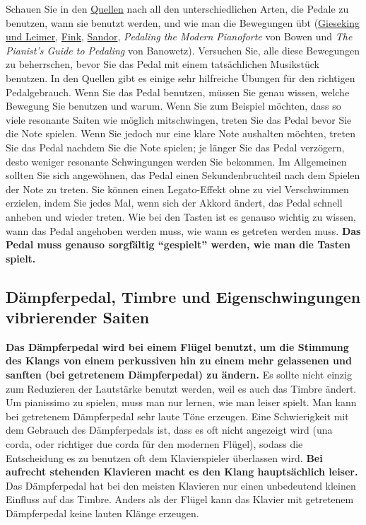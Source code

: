 Schauen Sie in den \hyperref[reference]{Quellen} nach all den unterschiedlichen Arten, die Pedale zu benutzen, wann sie benutzt werden, und wie man die Bewegungen übt (\hyperref[Gieseking]{Gieseking und Leimer}, \hyperref[Fink]{Fink}, \hyperref[Sandor]{Sandor}, \textit{Pedaling the Modern Pianoforte} von Bowen und \textit{The Pianist's Guide to Pedaling} von Banowetz).
Versuchen Sie, alle diese Bewegungen zu beherrschen, bevor Sie das Pedal mit einem tatsächlichen Musikstück benutzen.
In den Quellen gibt es einige sehr hilfreiche Übungen für den richtigen Pedalgebrauch.
Wenn Sie das Pedal benutzen, müssen Sie genau wissen, welche Bewegung Sie benutzen und warum.
Wenn Sie zum Beispiel möchten, dass so viele resonante Saiten wie möglich mitschwingen, treten Sie das Pedal bevor Sie die Note spielen.
Wenn Sie jedoch nur eine klare Note aushalten möchten, treten Sie das Pedal nachdem Sie die Note spielen; je länger Sie das Pedal verzögern, desto weniger resonante Schwingungen werden Sie bekommen.
Im Allgemeinen sollten Sie sich angewöhnen, das Pedal einen Sekundenbruchteil nach dem Spielen der Note zu treten.
Sie können einen Legato-Effekt ohne zu viel Verschwimmen erzielen, indem Sie jedes Mal, wenn sich der Akkord ändert, das Pedal schnell anheben und wieder treten.
Wie bei den Tasten ist es genauso wichtig zu wissen, wann das Pedal angehoben werden muss, wie wann es getreten werden muss.
\textbf{Das Pedal muss genauso sorgfältig \enquote{gespielt} werden, wie man die Tasten spielt.}


\subsection{Dämpferpedal, Timbre und Eigenschwingungen vibrierender Saiten}
\label{c1ii24}

\textbf{Das Dämpferpedal wird bei einem Flügel benutzt, um die Stimmung des Klangs von einem perkussiven hin zu einem mehr gelassenen und sanften (bei getretenem Dämpferpedal) zu ändern.}
Es sollte nicht einzig zum Reduzieren der Lautstärke benutzt werden, weil es auch das Timbre ändert.
Um pianissimo zu spielen, muss man nur lernen, wie man leiser spielt.
Man kann bei getretenem Dämpferpedal sehr laute Töne erzeugen.
Eine Schwierigkeit mit dem Gebrauch des Dämpferpedals ist, dass es oft nicht angezeigt wird (una corda, oder richtiger due corda für den modernen Flügel), sodass die Entscheidung es zu benutzen oft dem Klavierspieler überlassen wird.
\textbf{Bei aufrecht stehenden Klavieren macht es den Klang hauptsächlich leiser.}
Das Dämpferpedal hat bei den meisten Klavieren nur einen unbedeutend kleinen Einfluss auf das Timbre.
Anders als der Flügel kann das Klavier mit getretenem Dämpferpedal keine lauten Klänge erzeugen.

